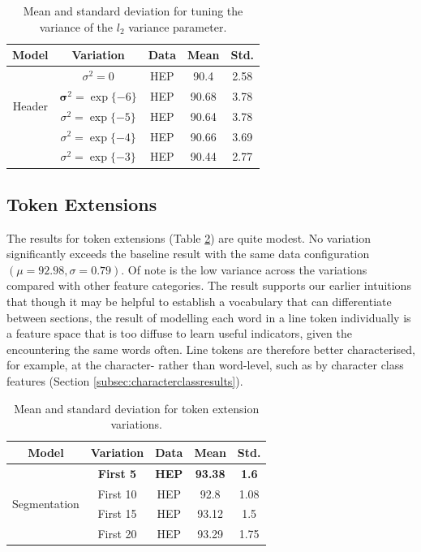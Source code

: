 \begin{table}[h]
\begin{center}
\begin{tabular}{|c|c|c|c|c|}
\hline
Model & Variation & Data & Mean & Std.\\
\hline
\multirow{4}{*}{Header} & $\sigma^2 = 0$ & HEP & 90.4 & 2.58\\\cline{2-5}
& $\mathbf \sigma^2 = \exp\{-6\}$ & HEP & 90.68 & 3.78\\\cline{2-5}
& $\sigma^2 = \exp\{-5\}$ & HEP & 90.64 & 3.78\\\cline{2-5}
& $\sigma^2 = \exp\{-4\}$ & HEP & 90.66 & 3.69\\\cline{2-5}
& $\sigma^2 = \exp\{-3\}$ & HEP & 90.44 & 2.77\\\cline{2-5}
\hline
\end{tabular}
\caption{Mean and standard deviation for tuning the variance of the $l_2$ variance parameter.}
\label{table:regularisationresults}
\end{center}
\end{table}

\subsection{Token Extensions}
\label{subsec:tokenextensionresults}

The results for token extensions (Table \ref{table:tokenextensions}) are quite modest. No variation significantly exceeds the baseline result with the same data configuration $(\mu = 92.98, \sigma = 0.79)$. Of note is the low variance across the variations compared with other feature categories. The result supports our earlier intuitions that though it may be helpful to establish a vocabulary that can differentiate between sections, the result of modelling each word in a line token individually is a feature space that is too diffuse to learn useful indicators, given the encountering the same words often. Line tokens are therefore better characterised, for example, at the character- rather than word-level, such as by character class features (Section \ref{subsec:characterclassresults}).

\begin{table}[h]
\begin{center}
\begin{tabular}{|c|c|c|c|c|}
\hline
Model & Variation & Data & Mean & Std.\\
\hline
\multirow{4}{*}{Segmentation} & \textbf{First 5} & \textbf{HEP} & \textbf{93.38} & \textbf{1.6}\\\cline{2-5}
& First 10 & HEP & 92.8 & 1.08\\\cline{2-5}
& First 15 & HEP & 93.12 & 1.5\\\cline{2-5}
& First 20 & HEP & 93.29 & 1.75\\\cline{2-5}
\hline
\end{tabular}
\caption{Mean and standard deviation for token extension variations.}
\label{table:tokenextensions}
\end{center}
\end{table}

